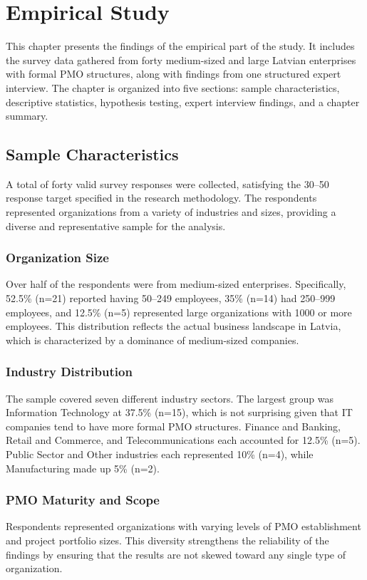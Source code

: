 \chapter{Empirical Study}
\label{chap:empirical}

This chapter presents the findings of the empirical part of the study.
It includes the survey data gathered from forty medium-sized and large
Latvian enterprises with formal PMO structures, along with findings
from one structured expert interview. The chapter is organized into
five sections: sample characteristics, descriptive statistics,
hypothesis testing, expert interview findings, and a chapter summary.

\section{Sample Characteristics}
\label{sec:sample}

A total of forty valid survey responses were collected, satisfying the
30--50 response target specified in the research methodology. The
respondents represented organizations from a variety of industries and
sizes, providing a diverse and representative sample for the analysis.

\subsection{Organization Size}
Over half of the respondents were from medium-sized enterprises.
Specifically, 52.5\% (n=21) reported having 50--249 employees, 35\%
(n=14) had 250--999 employees, and 12.5\% (n=5) represented large
organizations with 1000 or more employees. This distribution reflects
the actual business landscape in Latvia, which is characterized by
a dominance of medium-sized companies.

\subsection{Industry Distribution}
The sample covered seven different industry sectors. The largest group
was Information Technology at 37.5\% (n=15), which is not surprising
given that IT companies tend to have more formal PMO structures. Finance
and Banking, Retail and Commerce, and Telecommunications each accounted
for 12.5\% (n=5). Public Sector and Other industries each represented
10\% (n=4), while Manufacturing made up 5\% (n=2).

\subsection{PMO Maturity and Scope}
Respondents represented organizations with varying levels of PMO
establishment and project portfolio sizes. This diversity strengthens
the reliability of the findings by ensuring that the results are not
skewed toward any single type of organization.

